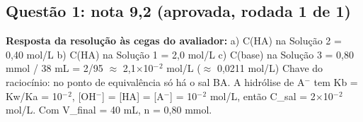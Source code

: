 \documentclass{article}%
\begin{document}
\subsection*{Questão 1: nota 9,2 (aprovada, rodada 1 de 1)}%
\textbf{Resposta da resolução às cegas do avaliador:} a) C(HA) na Solução 2 = 0,40 mol/L\newline%
b) C(HA) na Solução 1 = 2,0 mol/L\newline%
c) C(base) na Solução 3 = 0,80 mmol / 38 mL = 2/95 $\approx$ 2,1$\times$10$^{-}$$^2$ mol/L ($\approx$ 0,0211 mol/L)\newline%
\newline%
Chave do raciocínio: no ponto de equivalência só há o sal BA. A hidrólise de A$^{-}$ tem Kb = Kw/Ka = 10$^{-}$$^2$, {[}OH$^{-}${]} = {[}HA{]} = {[}A$^{-}${]} = 10$^{-}$$^2$ mol/L, então C\_sal = 2$\times$10$^{-}$$^2$ mol/L. Com V\_final = 40 mL, n = 0,80 mmol.\par %
\end{document}
